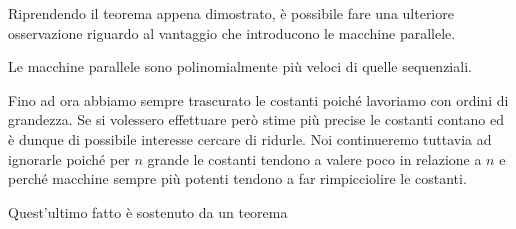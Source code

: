 Riprendendo il teorema appena dimostrato, è possibile fare una
ulteriore osservazione riguardo al vantaggio che introducono le
macchine parallele.

\begin{corollary}
	Le macchine parallele sono polinomialmente più veloci di
	quelle sequenziali.
\end{corollary}

Fino ad ora abbiamo sempre trascurato le costanti poiché
lavoriamo con ordini di grandezza. Se si volessero effettuare
però stime più precise le costanti contano ed è dunque di
possibile interesse cercare di ridurle. Noi continueremo tuttavia
ad ignorarle poiché per $n$ grande le costanti tendono a valere
poco in relazione a $n$ e perché macchine sempre più potenti
tendono a far rimpicciolire le costanti.

Quest'ultimo fatto è sostenuto da un teorema